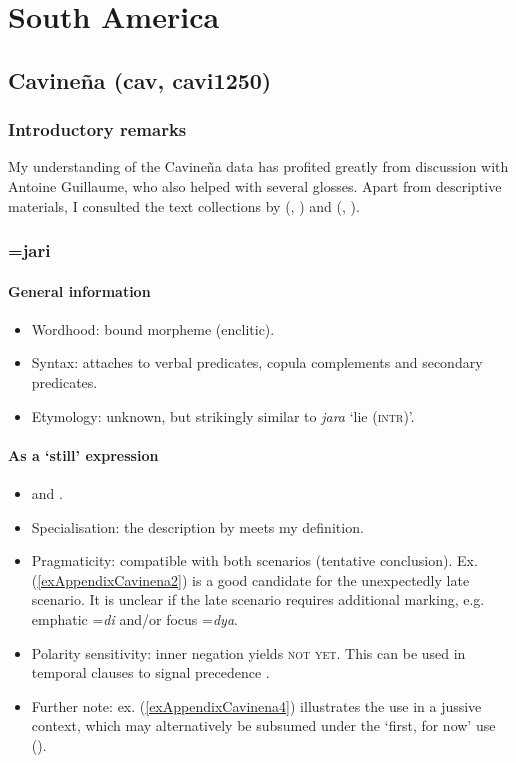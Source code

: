 \chapter{South America}
\label{appendixSouthAmerica}
\largerpage
\section{Cavineña (cav, cavi1250)}
\subsection{Introductory remarks}
My understanding of the Cavineña data has profited greatly from discussion with Antoine Guillaume, who also helped with several glosses. Apart from descriptive materials, I consulted the text collections by \citeauthor{CampLiccardi1973} (\citeyear{CampLiccardi1973}, \citeyear{CampLiccardi1989}) and \citeauthor{TaboMayo1977} (\citeyear{TaboMayo1977}, \citeyear{TaboMayo1978}).

\subsection{=jari}
\subsubsection{General information}
\begin{itemize}
	\item Wordhood: bound morpheme (enclitic).
	\item Syntax: attaches to verbal predicates, copula complements and secondary predicates.
	\item Etymology: unknown, but strikingly similar to \textit{jara} \lq lie (\textsc{intr})'.
\end{itemize}

\subsubsection{As a \lq{}still\rq{ }expression}
\begin{itemize}
	\item \textcite[67, 246]{CampLiccardi1989} and \textcite[660–662]{Guillaume2008}.
	\item Specialisation: the description by \citeauthor{Guillaume2008} meets my definition.
	\item Pragmaticity: compatible with both scenarios (tentative conclusion).  Ex. (\ref{exAppendixCavinena2}) is a good candidate for the unexpectedly late scenario. It is unclear if the late scenario requires additional marking, e.g. emphatic \mbox{=\textit{di}} and/or focus \mbox{=\textit{dya}}.
	\item Polarity sensitivity: inner negation yields \textsc{not yet}. This can be used in temporal clauses to signal precedence  \parencite[278]{CampLiccardi1989}.
	\item Further note: ex. (\ref{exAppendixCavinena4}) illustrates the use in a jussive context, which may alternatively be subsumed under the \lq first, for now\rq{ }use ().
\end{itemize}

